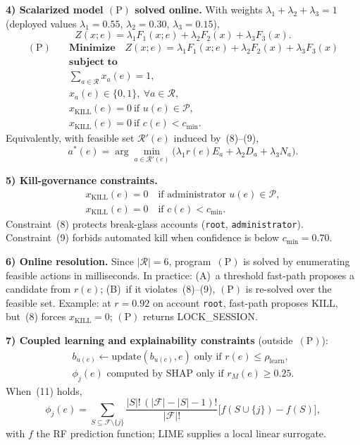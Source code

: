 \textbf{4) Scalarized model $(\mathrm{P})$ solved online.}
With weights $\lambda_1+\lambda_2+\lambda_3=1$ (deployed values $\lambda_1{=}0.55$, $\lambda_2{=}0.30$, $\lambda_3{=}0.15$),
\begin{equation}
Z(x;e)=\lambda_1 F_1(x;e)+\lambda_2 F_2(x)+\lambda_3 F_3(x).
\tag{6}
\end{equation}
\begin{equation}
\begin{aligned}
(\mathrm{P})\quad
& \textbf{Minimize}\quad Z(x;e)=\lambda_1 F_1(x;e)+\lambda_2 F_2(x)+\lambda_3 F_3(x) \\[0.35em]
& \textbf{subject to} \\
& \sum_{a\in\mathcal{R}} x_a(e)=1, \\
& x_a(e)\in\{0,1\},\ \forall a\in\mathcal{R}, \\
& x_{\mathrm{KILL}}(e)=0\ \text{if } u(e)\in\mathcal{P}, \\
& x_{\mathrm{KILL}}(e)=0\ \text{if } c(e)<c_{\min}.
\end{aligned}
\tag{P}\label{art-eq:moo-main}
\end{equation}
Equivalently, with feasible set $\mathcal{R}'(e)$ induced by~(8)--(9),
\begin{equation}
a^*(e)=\arg\min_{a\in\mathcal{R}'(e)}\bigl(\lambda_1 r(e)E_a+\lambda_2 D_a+\lambda_3 N_a\bigr).
\tag{7}
\end{equation}

\textbf{5) Kill-governance constraints.}
\begin{align}
&x_{\mathrm{KILL}}(e)=0 \quad \text{if administrator } u(e)\in\mathcal{P},
&\tag{8}\\
&x_{\mathrm{KILL}}(e)=0 \quad \text{if } c(e)<c_{\min}.
&\tag{9}
\end{align}
Constraint~(8) protects break-glass accounts (\texttt{root}, \texttt{administrator}). Constraint~(9) forbids automated kill when confidence is below $c_{\min}{=}0.70$.

\textbf{6) Online resolution.}
Since $|\mathcal{R}|=6$, program~$(\mathrm{P})$ is solved by enumerating feasible actions in milliseconds. In practice: (A)~a threshold fast-path proposes a candidate from $r(e)$; (B)~if it violates~(8)--(9), $(\mathrm{P})$ is re-solved over the feasible set. Example: at $r{=}0.92$ on account \texttt{root}, fast-path proposes KILL, but~(8) forces $x_{\mathrm{KILL}}=0$; $(\mathrm{P})$ returns LOCK\_SESSION.

\textbf{7) Coupled learning and explainability constraints} (outside~$(\mathrm{P})$):
\begin{align}
&b_{u(e)} \leftarrow \text{update}(b_{u(e)},e) \;\text{only if } r(e)\leq\rho_{\mathrm{learn}},
&\tag{10}\\
&\phi_j(e) \text{ computed by SHAP only if } r_M(e)\geq 0.25.
&\tag{11}
\end{align}
When~(11) holds,
\begin{equation}
\phi_j(e)=\sum_{S\subseteq\mathcal{F}\setminus\{j\}} \frac{|S|!\,(|\mathcal{F}|-|S|-1)!}{|\mathcal{F}|!}\bigl[f(S\cup\{j\})-f(S)\bigr],
\tag{12}
\end{equation}
with $f$ the RF prediction function; LIME supplies a local linear surrogate.

